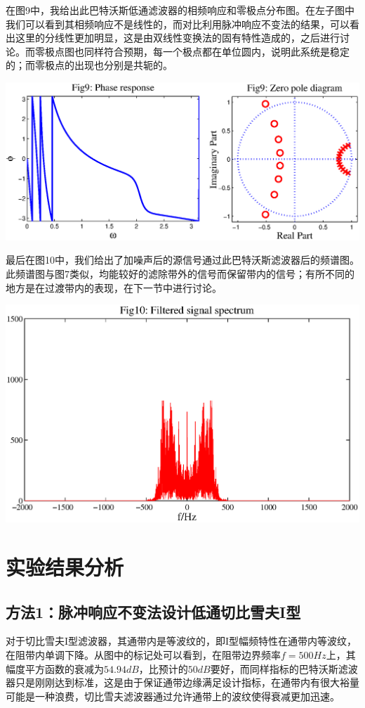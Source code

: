 \documentclass[a4paper,11pt,onecolumn,twoside]{article}
\begin{document}
在图9中，我给出此巴特沃斯低通滤波器的相频响应和零极点分布图。在左子图中我们可以看到其相频响应不是线性的，而对比利用脉冲响应不变法的结果，可以看出这里的分线性更加明显，这是由双线性变换法的固有特性造成的，之后进行讨论。而零极点图也同样符合预期，每一个极点都在单位圆内，说明此系统是稳定的；而零极点的出现也分别是共轭的。
\begin{center}
    \includegraphics[width=1\textwidth]{fig9.eps}
\end{center}

最后在图10中，我们给出了加噪声后的源信号通过此巴特沃斯滤波器后的频谱图。此频谱图与图7类似，均能较好的滤除带外的信号而保留带内的信号；有所不同的地方是在过渡带内的表现，在下一节中进行讨论。
\begin{center}
    \includegraphics[width=1\textwidth]{fig10.eps}
\end{center}


\section{实验结果分析}

\subsection{方法1：脉冲响应不变法设计低通切比雪夫I型}
对于切比雪夫I型滤波器，其通带内是等波纹的，即I型幅频特性在通带内等波纹，在阻带内单调下降。从图中的标记处可以看到，在阻带边界频率$f=500Hz$上，其幅度平方函数的衰减为$54.94dB$，比预计的$50dB$要好，而同样指标的巴特沃斯滤波器只是刚刚达到标准，这是由于保证通带边缘满足设计指标，在通带内有很大裕量可能是一种浪费，切比雪夫滤波器通过允许通带上的波纹使得衰减更加迅速。
\end{document}
